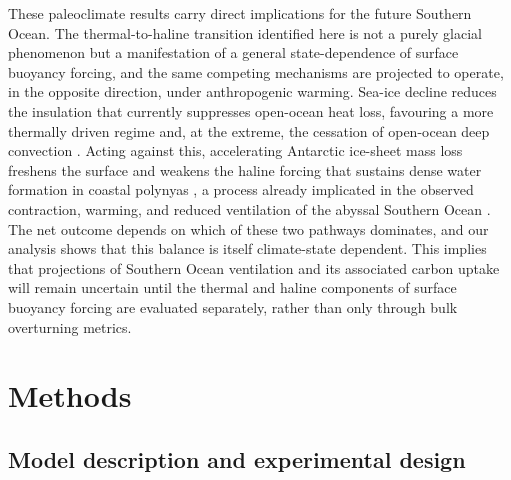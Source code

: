 \documentclass[pdflatex,sn-nature]{sn-jnl}
\begin{document}
These paleoclimate results carry direct implications for the future Southern Ocean. The thermal-to-haline transition identified here is not a purely glacial phenomenon but a manifestation of a general state-dependence of surface buoyancy forcing, and the same competing mechanisms are projected to operate, in the opposite direction, under anthropogenic warming. Sea-ice decline reduces the insulation that currently suppresses open-ocean heat loss, favouring a more thermally driven regime and, at the extreme, the cessation of open-ocean deep convection \cite{deLavergne2014}. Acting against this, accelerating Antarctic ice-sheet mass loss freshens the surface and weakens the haline forcing that sustains dense water formation in coastal polynyas \cite{Silvano2018,Jeong2023}, a process already implicated in the observed contraction, warming, and reduced ventilation of the abyssal Southern Ocean \cite{Li2023Nature,Gunn2023}. The net outcome depends on which of these two pathways dominates, and our analysis shows that this balance is itself climate-state dependent. This implies that projections of Southern Ocean ventilation and its associated carbon uptake will remain uncertain until the thermal and haline components of surface buoyancy forcing are evaluated separately, rather than only through bulk overturning metrics.

\section{Methods}

\subsection{Model description and experimental design}
\end{document}
